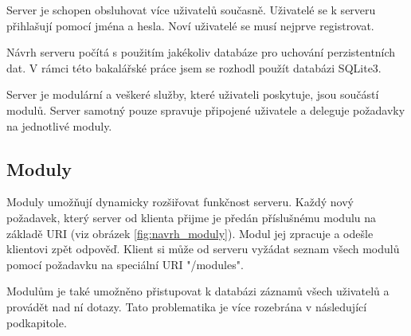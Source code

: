 Server je schopen obsluhovat více uživatelů současně.
Uživatelé se k serveru přihlašují pomocí jména a hesla. Noví uživatelé se musí nejprve registrovat.

Návrh serveru počítá s použitím jakékoliv databáze pro uchování perzistentních dat. V rámci této bakalářské práce jsem se 
rozhodl použít databázi SQLite3.

Server je modulární a veškeré služby, které uživateli poskytuje, jsou součástí modulů. Server samotný pouze spravuje
připojené uživatele a deleguje požadavky na jednotlivé moduly.

\subsection{Moduly}
\label{navrh_moduly}

Moduly umožňují dynamicky rozšiřovat funkčnost serveru. Každý nový požadavek, který server od klienta přijme je
předán příslušnému modulu na základě URI (viz obrázek \ref{fig:navrh_moduly}).
Modul jej zpracuje a odešle klientovi zpět odpověď. Klient si může
od serveru vyžádat seznam všech modulů pomocí požadavku na speciální URI "/modules".

Modulům je také umožněno přistupovat k databázi záznamů všech uživatelů a provádět nad ní dotazy. Tato problematika je více
rozebrána v následující podkapitole.

